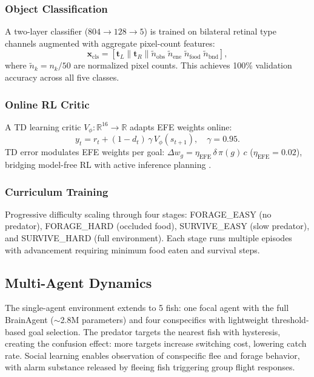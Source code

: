 \documentclass[12pt]{article}
\begin{document}
\subsubsection{Object Classification}

A two-layer classifier ($804 \to 128 \to 5$) is trained on bilateral
retinal type channels augmented with aggregate pixel-count features:
\begin{equation}\label{eq:classifier}
  \mathbf{x}_\text{cls} = [\mathbf{t}_L \| \mathbf{t}_R \|
    \tilde{n}_\text{obs}\;\tilde{n}_\text{ene}\;
    \tilde{n}_\text{food}\;\tilde{n}_\text{bnd}],
\end{equation}
where $\tilde{n}_k = n_k/50$ are normalized pixel counts.
This achieves 100\% validation accuracy across all five classes.

\subsubsection{Online RL Critic}

A TD learning critic $V_\phi: \mathbb{R}^{16} \to \mathbb{R}$
adapts EFE weights online:
\begin{equation}\label{eq:td}
  y_t = r_t + (1-d_t)\,\gamma\,V_\phi(s_{t+1}), \quad \gamma = 0.95.
\end{equation}
TD error modulates EFE weights per goal:
$\Delta w_g = \eta_\text{EFE}\,\delta\,\pi(g)\,c$
($\eta_\text{EFE} = 0.02$), bridging model-free RL with active
inference planning \citep{sutton2018}.

\subsubsection{Curriculum Training}

Progressive difficulty scaling through four stages: FORAGE\_EASY
(no predator), FORAGE\_HARD (occluded food), SURVIVE\_EASY (slow
predator), and SURVIVE\_HARD (full environment).
Each stage runs multiple episodes with advancement requiring minimum
food eaten and survival steps.

\subsection{Multi-Agent Dynamics}\label{sec:multiagent}

The single-agent environment extends to 5 fish: one focal agent
with the full BrainAgent ($\sim$2.8M parameters) and four
conspecifics with lightweight threshold-based goal selection.
The predator targets the nearest fish with hysteresis, creating the
confusion effect: more targets increase switching cost, lowering
catch rate.
Social learning enables observation of conspecific flee and forage
behavior, with alarm substance released by fleeing fish triggering
group flight responses.
\end{document}

